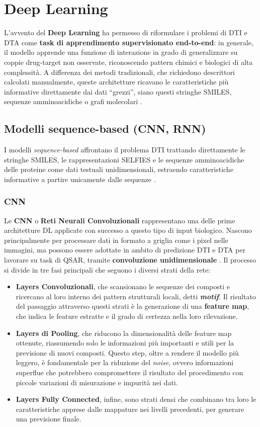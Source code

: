 \section{Deep Learning}
L'avvento del \textbf{Deep Learning} ha permesso di riformulare i problemi di DTI e
DTA come \textbf{task di apprendimento supervisionato end-to-end}: in generale, il modello
apprende una funzione di interazione
in grado di generalizzare su coppie drug-target non osservate,
riconoscendo pattern chimici e biologici di alta complessità.
A differenza dei metodi tradizionali, che richiedono descrittori calcolati manualmente, queste architetture ricavano
le caratteristiche più informative direttamente dai dati ``grezzi'', siano
questi stringhe SMILES, sequenze amminoacidiche o grafi molecolari
\cite{wangUnifiedSurveyDrugtarget2026a}.
\subsection{Modelli sequence-based (CNN, RNN)}
I modelli \textit{sequence-based} affrontano il problema DTI trattando
direttamente le stringhe SMILES, le rappresentazioni SELFIES e le sequenze amminoacidiche delle proteine come dati testuali unidimensionali, estraendo caratteristiche informative a partire unicamente dalle sequenze \cite{tangTCDTAPredictingDrugTarget2024a}.
\subsubsection{CNN}
\label{subsec:cnn}
Le \textbf{CNN} o \textbf{Reti Neurali Convoluzionali} rappresentano una
delle prime architetture DL applicate con successo a questo tipo di input
biologico.
Nascono principalmente per processare dati in formato a griglia come i
pixel nelle immagini, ma possono essere adottate in ambito di predizione
DTI e DTA per lavorare su task di QSAR, tramite \textbf{convoluzione
unidimensionale} \cite{odugbemiArtificialIntelligenceAntidiabetic2024}.
Il processo si divide in tre fasi principali che seguono i diversi strati
della rete:
\begin{itemize}
    \item \textbf{Layers Convoluzionali}, che scansionano le sequenze dei
    composti e ricercano al loro interno dei pattern strutturali locali,
    detti \textit{\textbf{motif}}.
    Il risultato del passaggio attraverso questi strati è la generazione
    di una \textbf{feature map}, che indica le feature estratte e
    il grado di certezza nella loro rilevazione.
    \item \textbf{Layers di Pooling}, che riducono la dimensionalità delle
    feature map ottenute, riassumendo solo le informazioni più importanti
    e utili per la previsione di nuovi composti. Questo step, oltre a
    rendere il modello più leggero, è fondamentale per la riduzione del
    \textit{noise}, ovvero informazioni superflue che potrebbero
    compromettere il risultato del procedimento con piccole variazioni di
    misurazione e impurità nei dati.
    \item \textbf{Layers Fully Connected}, infine, sono strati densi che
    combinano tra loro le caratteristiche apprese dalle mappature nei
    livelli precedenti, per generare una previsione finale.
\end{itemize}

